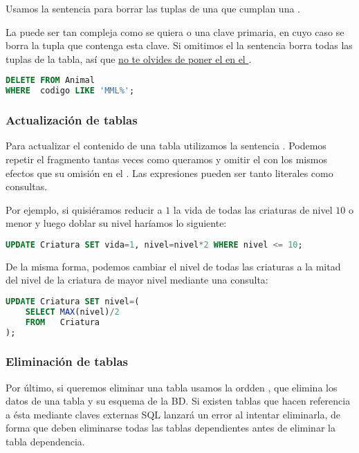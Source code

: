 Usamos la sentencia  para borrar las tuplas de una  que cumplan una .

La  puede ser tan compleja como se quiera o una clave primaria, en cuyo caso se borra la tupla que contenga esta clave.
Si omitimos el  la sentencia borra todas las tuplas de la tabla, así que \href{https://www.youtube.com/watch?v=i_cVJgIz_Cs}{no te olvides de poner el  en el }.

\begin{lstlisting}[language=SQL]
DELETE FROM Animal
WHERE  codigo LIKE 'MML%';
\end{lstlisting}

\subsubsection{Actualización de tablas}

Para actualizar el contenido de una tabla utilizamos la sentencia .
Podemos repetir el fragmento  tantas veces como queramos y omitir el  con los mismos efectos que su omisión en el .
Las expresiones pueden ser tanto literales como consultas.

Por ejemplo, si quisiéramos reducir a $1$ la vida de todas las criaturas de nivel $10$ o menor y luego doblar su nivel haríamos lo siguiente:

\begin{lstlisting}[language=SQL]
UPDATE Criatura SET vida=1, nivel=nivel*2 WHERE nivel <= 10;
\end{lstlisting}

De la misma forma, podemos cambiar el nivel de todas las criaturas a la mitad del nivel de la criatura de mayor nivel mediante una consulta:

\begin{lstlisting}[language=SQL]
UPDATE Criatura SET nivel=(
	SELECT MAX(nivel)/2
	FROM   Criatura
);
\end{lstlisting}

\subsubsection{Eliminación de tablas}

Por último, si queremos eliminar una tabla usamos la ordden , que elimina los datos de una tabla y su esquema de la BD\@.
Si existen tablas que hacen referencia a ésta mediante claves externas SQL lanzará un error al intentar eliminarla, de forma que deben eliminarse todas las tablas dependientes antes de eliminar la tabla dependencia.

